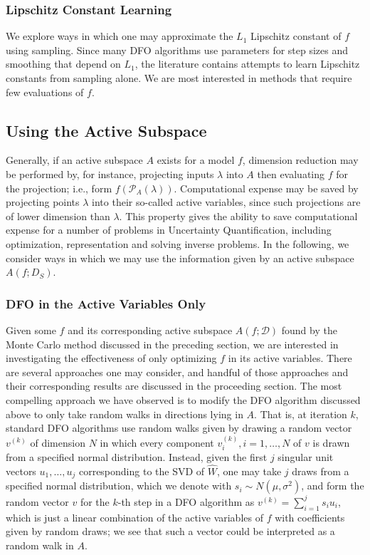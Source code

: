 \documentclass{amsart}
\begin{document}
\subsubsection{Lipschitz Constant Learning} We explore ways in which one may approximate the $L_1$ Lipschitz constant of $f$ using sampling. Since many DFO algorithms use parameters for step sizes and smoothing that depend on $L_1$, the literature \cite{KS} contains attempts to learn Lipschitz constants from sampling alone. We are most interested in methods that require few evaluations of $f$.

\subsection{Using the Active Subspace} Generally, if an active subspace $A$ exists for a model $f$, dimension reduction may be performed by, for instance, projecting inputs $\lambda$ into $A$ then evaluating $f$ for the projection; i.e., form $f\left(\mathcal{P}_A(\lambda)\right)$. Computational expense may be saved by projecting points $\lambda$ into their so-called active variables, since such projections are of lower dimension than $\lambda$. This property gives the ability to save computational expense for a number of problems in Uncertainty Quantification, including optimization, representation and solving inverse problems. In the following, we consider ways in which we may use the information given by an active subspace $A(f;D_S)$.

\subsubsection{DFO in the Active Variables Only} Given some $f$ and its corresponding active subspace $A(f;\mathcal{D})$ found by the Monte Carlo method discussed in the preceding section, we are interested in investigating the effectiveness of only optimizing $f$ in its active variables. There are several approaches one may consider, and handful of those approaches and their corresponding results are discussed in the proceeding section. The most compelling approach we have observed is to modify the DFO algorithm discussed above to only take random walks in directions lying in $A$. That is, at iteration $k$, standard DFO algorithms \cite{CW} use random walks given by drawing a random vector $v^{(k)}$ of dimension $N$ in which every component $v_i^{(k)},i=1,\ldots,N$ of $v$ is  drawn from a specified normal distribution. Instead, given the first $j$ singular unit vectors $u_1,\ldots,u_j$ corresponding to the SVD of $\hat{W}$, one may take $j$ draws from a specified normal distribution, which we denote with $s_i\sim N(\mu,\sigma^2)$, and form the random vector $v$ for the $k$-th step in a DFO algorithm as $v^{(k)}=\sum_{i=1}^js_iu_i$, which is just a linear combination of the active variables of $f$ with coefficients given by random draws; we see that such a vector could be interpreted as a random walk in $A$.
\end{document}
